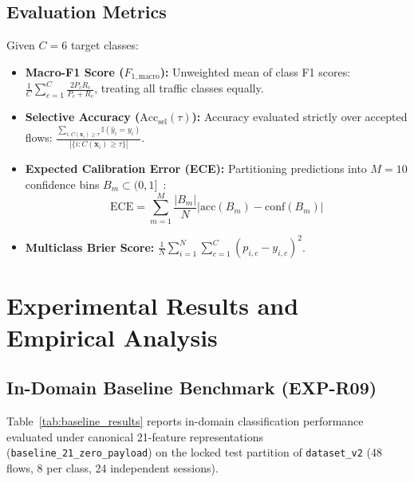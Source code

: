 \documentclass[conference]{IEEEtran}
\begin{document}
\subsection{Evaluation Metrics}
Given $C=6$ target classes:
\begin{itemize}
    \item \textbf{Macro-F1 Score ($F_{1,\text{macro}}$):} Unweighted mean of class F1 scores: $\frac{1}{C}\sum_{c=1}^C \frac{2 P_c R_c}{P_c + R_c}$, treating all traffic classes equally.
    \item \textbf{Selective Accuracy ($\text{Acc}_{\text{sel}}(\tau)$):} Accuracy evaluated strictly over accepted flows: $\frac{\sum_{i: C(\mathbf{x}_i) \ge \tau} \mathbb{I}(\hat{y}_i = y_i)}{|\{i : C(\mathbf{x}_i) \ge \tau\}|}$.
    \item \textbf{Expected Calibration Error (ECE):} Partitioning predictions into $M=10$ confidence bins $B_m \subset (0, 1]$~\cite{guo2017calibration}:
    \begin{equation}
        \text{ECE} = \sum_{m=1}^M \frac{|B_m|}{N} \left| \text{acc}(B_m) - \text{conf}(B_m) \right|
    \end{equation}
    \item \textbf{Multiclass Brier Score:} $\frac{1}{N}\sum_{i=1}^N \sum_{c=1}^C (p_{i,c} - y_{i,c})^2$.
\end{itemize}

\section{Experimental Results and Empirical Analysis}
\label{sec:results}

\subsection{In-Domain Baseline Benchmark (EXP-R09)}
Table~\ref{tab:baseline_results} reports in-domain classification performance evaluated under canonical 21-feature representations (\texttt{baseline\_21\_zero\_payload}) on the locked test partition of \texttt{dataset\_v2} (48 flows, 8 per class, 24 independent sessions).
\end{document}
